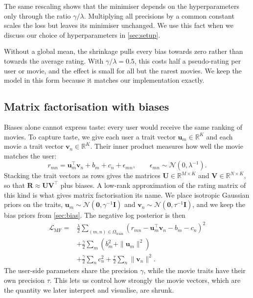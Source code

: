\documentclass{article}
\theoremstyle{plain}
\theoremstyle{definition}
\theoremstyle{remark}
\begin{document}
The same rescaling shows that the minimiser depends on the hyperparameters
only through the ratio $\gamma/\lambda$. Multiplying all precisions by a
common constant scales the loss but leaves its minimiser unchanged. We use
this fact when we discuss our choice of hyperparameters in
\cref{sec:setup}.

Without a global mean, the shrinkage pulls every bias towards zero rather
than towards the average rating. With $\gamma/\lambda = 0.5$, this costs
half a pseudo-rating per user or movie, and the effect is small for all but
the rarest movies. We keep the model in this form because it matches our
implementation exactly.

\subsection{Matrix factorisation with biases}
\label{sec:mf}

Biases alone cannot express taste: every user would receive the same
ranking of movies. To capture taste, we give each user a trait vector
$\mathbf{u}_m \in \mathbb{R}^K$ and each movie a trait vector
$\mathbf{v}_n \in \mathbb{R}^K$. Their inner product measures how well the
movie matches the user:
\begin{equation}
  r_{mn} = \mathbf{u}_m^\top \mathbf{v}_n + b_m + c_n + \epsilon_{mn},
  \qquad \epsilon_{mn} \sim \mathcal{N}(0, \lambda^{-1}) .
  \label{eq:mf-lik}
\end{equation}
Stacking the trait vectors as rows gives the matrices
$\mathbf{U} \in \mathbb{R}^{M \times K}$ and
$\mathbf{V} \in \mathbb{R}^{N \times K}$, so that
$\mathbf{R} \approx \mathbf{U}\mathbf{V}^\top$ plus biases. A low-rank
approximation of the rating matrix of this kind is what gives
matrix factorisation its name. We place isotropic Gaussian priors on the
traits, $\mathbf{u}_m \sim \mathcal{N}(\mathbf{0}, \gamma^{-1}\mathbf{I})$ and
$\mathbf{v}_n \sim \mathcal{N}(\mathbf{0}, \tau^{-1}\mathbf{I})$, and we keep
the bias priors from \cref{sec:bias}. The negative log posterior is then
\begin{align}
  \mathcal{L}_{\text{MF}} = {}&
  \frac{\lambda}{2} \sum_{(m,n) \in \Omega_{\text{train}}}
  \left( r_{mn} - \mathbf{u}_m^\top \mathbf{v}_n - b_m - c_n \right)^2
  \nonumber \\
  & + \frac{\gamma}{2} \sum_{m} \left( b_m^2 + \|\mathbf{u}_m\|^2 \right)
  \nonumber \\
  & + \frac{\gamma}{2} \sum_{n} c_n^2
  + \frac{\tau}{2} \sum_{n} \|\mathbf{v}_n\|^2 .
  \label{eq:loss-mf}
\end{align}
The user-side parameters share the precision $\gamma$, while the movie
traits have their own precision $\tau$. This lets us control how strongly
the movie vectors, which are the quantity we later interpret and visualise,
are shrunk.
\end{document}
